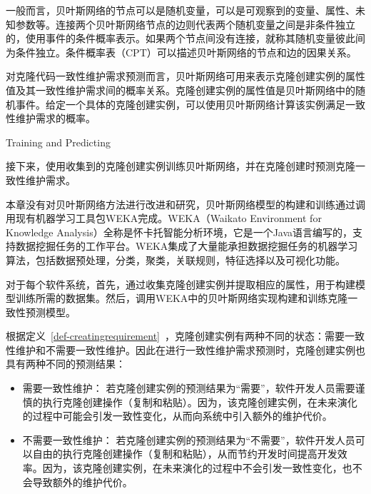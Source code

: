 一般而言，贝叶斯网络的节点可以是随机变量，可以是可观察到的变量、属性、未知参数等。连接两个贝叶斯网络节点的边则代表两个随机变量之间是非条件独立的，使用事件的条件概率表示。如果两个节点间没有连接，就称其随机变量彼此间为条件独立。条件概率表（CPT）可以描述贝叶斯网络的节点和边的因果关系。

对克隆代码一致性维护需求预测而言，贝叶斯网络可用来表示克隆创建实例的属性值及其一致性维护需求间的概率关系。克隆创建实例的属性值是贝叶斯网络中的随机事件。给定一个具体的克隆创建实例，可以使用贝叶斯网络计算该实例满足一致性维护需求的概率。



{Training and Predicting}

接下来，使用收集到的克隆创建实例训练贝叶斯网络，并在克隆创建时预测克隆一致性维护需求。

本章没有对贝叶斯网络方法进行改进和研究，贝叶斯网络模型的构建和训练通过调用现有机器学习工具包WEKA完成。WEKA（Waikato Environment for Knowledge Analysis）全称是怀卡托智能分析环境，它是一个Java语言编写的，支持数据挖掘任务的工作平台。WEKA集成了大量能承担数据挖掘任务的机器学习算法，包括数据预处理，分类，聚类，关联规则，特征选择以及可视化功能。

对于每个软件系统，首先，通过收集克隆创建实例并提取相应的属性，用于构建模型训练所需的数据集。然后，调用WEKA中的贝叶斯网络实现构建和训练克隆一致性预测模型。

根据定义~\ref{def-creatingrequirement}~，克隆创建实例有两种不同的状态：需要一致性维护和不需要一致性维护。因此在进行一致性维护需求预测时，克隆创建实例也具有两种不同的预测结果：
\begin{itemize}
\item 
需要一致性维护：
若克隆创建实例的预测结果为“需要”，软件开发人员需要谨慎的执行克隆创建操作（复制和粘贴）。因为，该克隆创建实例，在未来演化的过程中可能会引发一致性变化，从而向系统中引入额外的维护代价。
\item
不需要一致性维护：
若克隆创建实例的预测结果为“不需要”，软件开发人员可以自由的执行克隆创建操作（复制和粘贴），从而节约开发时间提高开发效率。因为，该克隆创建实例，在未来演化的过程中不会引发一致性变化，也不会导致额外的维护代价。
\end{itemize}

